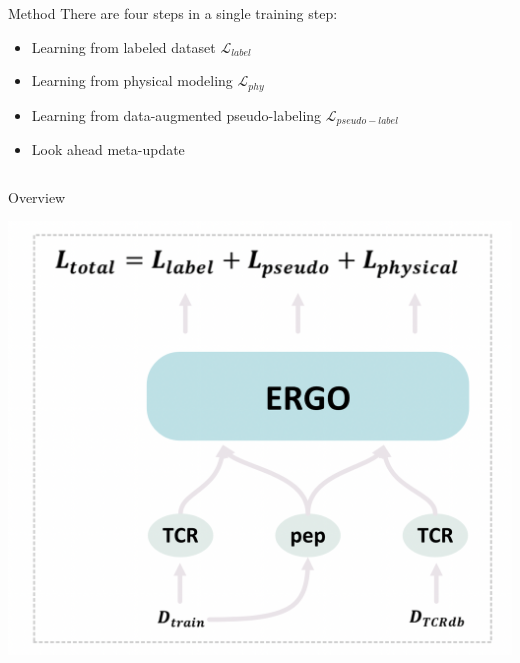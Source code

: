 \documentclass[aspectratio=1610,xcolor={dvipsnames},hyperref={colorlinks,unicode,linkcolor=violet,anchorcolor=blueviolet,citecolor=YellowOrange,filecolor=black,urlcolor=Aquamarine}]{beamer}
\begin{document}
\begin{frame}[label={sec:org47b6726}]{Method}
There are four steps in a single training step:

\begin{itemize}
\item Learning from labeled dataset \(\mathcal{L}_{label}\)
\item Learning from physical modeling \(\mathcal{L}_{phy}\)
\item Learning from data-augmented pseudo-labeling \(\mathcal{L}_{pseudo-label}\)
\item Look ahead meta-update
\end{itemize}

\begin{columns}
\begin{column}{0.4\columnwidth}
\begin{block}{Overview}
\begin{center}
\includegraphics[width=.9\linewidth]{./p2.png}
\end{center}
\end{block}
\end{column}


\end{columns}
\end{frame}
\end{document}
